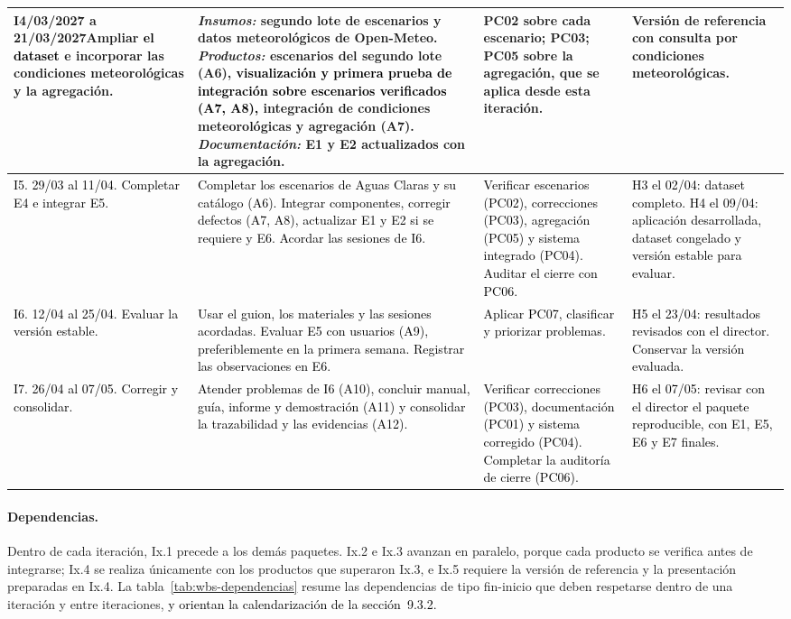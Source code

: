 \begin{longtable}{|p{}|p{}|p{}|p{}|}
\raggedright \textbf{I4}\newline 08/03/2027 a 21/03/2027\newline Ampliar \textcolor{black}{el dataset} e incorporar las condiciones meteorológicas y la agregación. & \textit{Insumos:} segundo lote de escenarios y datos meteorológicos de Open-Meteo. \textit{Productos:} escenarios del segundo lote (A6), \textcolor{black}{visualización y primera prueba de integración sobre escenarios verificados (A7, A8),} integración de condiciones meteorológicas y agregación (A7). \textit{Documentación:} E1 y E2 actualizados con la agregación. & \raggedright PC02 sobre cada escenario; PC03; PC05 sobre la agregación, que se aplica desde esta iteración. & \raggedright Versión de referencia con consulta por condiciones meteorológicas.\tabularnewline\hline
\textcolor{black}{I5. 29/03 al 11/04. Completar E4 e integrar E5.} & \textcolor{black}{Completar los escenarios de Aguas Claras y su catálogo (A6). Integrar componentes, corregir defectos (A7, A8), actualizar E1 y E2 si se requiere y E6. Acordar las sesiones de I6.} & \textcolor{black}{Verificar escenarios (PC02), correcciones (PC03), agregación (PC05) y sistema integrado (PC04). Auditar el cierre con PC06.} & \textcolor{black}{H3 el 02/04: \textcolor{black}{dataset completo}. H4 el 09/04: aplicación desarrollada, \textcolor{black}{dataset congelado} y versión estable para evaluar.}\tabularnewline\hline
\textcolor{black}{I6. 12/04 al 25/04. Evaluar la versión estable.} & \textcolor{black}{Usar el guion, los materiales y las sesiones acordadas. Evaluar E5 con usuarios (A9), preferiblemente en la primera semana. Registrar las observaciones en E6.} & \textcolor{black}{Aplicar PC07, clasificar y priorizar problemas.} & \textcolor{black}{H5 el 23/04: resultados revisados con el director. Conservar la versión evaluada.}\tabularnewline\hline
\textcolor{black}{I7. 26/04 al 07/05. Corregir y consolidar.} & \textcolor{black}{Atender problemas de I6 (A10), concluir manual, guía, informe y demostración (A11) y consolidar la trazabilidad y las evidencias (A12).} & \textcolor{black}{Verificar correcciones (PC03), documentación (PC01) y sistema corregido (PC04). Completar la auditoría de cierre (PC06).} & \textcolor{black}{H6 el 07/05: revisar con el director el paquete reproducible, con E1, E5, E6 y E7 finales.}\tabularnewline\hline
\end{longtable}

\paragraph{Dependencias.}
Dentro de cada iteración, Ix.1 precede a los demás paquetes. Ix.2 e Ix.3 avanzan en paralelo, porque cada producto se verifica antes de integrarse; Ix.4 se realiza únicamente con los productos que superaron Ix.3, e Ix.5 requiere la versión de referencia y la presentación preparadas en Ix.4. La tabla~\ref{tab:wbs-dependencias} resume las dependencias de tipo fin-inicio que deben respetarse dentro de una iteración y entre iteraciones, \textcolor{black}{y orientan la calendarización de la sección~9.3.2.}


